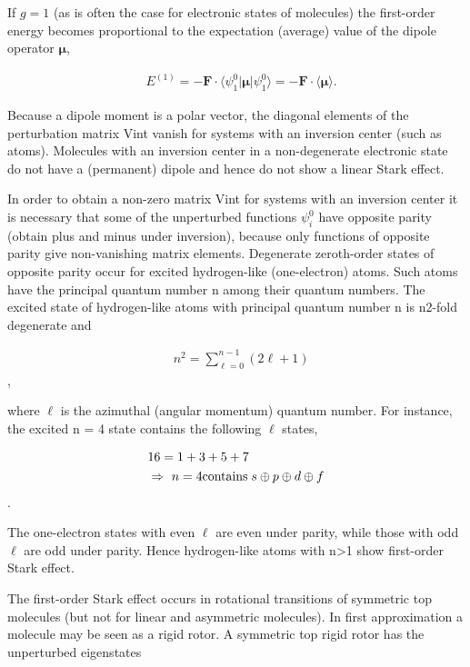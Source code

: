 If $g = 1$ (as is often the case for electronic states of molecules) the first-order energy becomes proportional to the expectation (average) value of the dipole operator $\boldsymbol{\mu}$,

\begin{align*}
&E^{(1)} = -\mathbf{F}\cdot \langle \psi^0_1 | \boldsymbol{\mu} | \psi^0_1 \rangle = -\mathbf{F}\cdot \langle \boldsymbol{\mu} \rangle.
\end{align*}

Because a dipole moment is a polar vector, the diagonal elements of the perturbation matrix Vint vanish for systems with an inversion center (such as atoms). Molecules with an inversion center in a non-degenerate electronic state do not have a (permanent) dipole and hence do not show a linear Stark effect.

In order to obtain a non-zero matrix Vint for systems with an inversion center it is necessary that some of the unperturbed functions $\psi^0_i$ have opposite parity (obtain plus and minus under inversion), because only functions of opposite parity give non-vanishing matrix elements. Degenerate zeroth-order states of opposite parity occur for excited hydrogen-like (one-electron) atoms. Such atoms have the principal quantum number n among their quantum numbers. The excited state of hydrogen-like atoms with principal quantum number n is n2-fold degenerate and

\begin{align*}
&n^2 = \sum_{\ell=0}^{n-1} (2 \ell + 1)
\end{align*}, 

where $\ell$ is the azimuthal (angular momentum) quantum number. For instance, the excited n = 4 state contains the following $\ell$ states,

\begin{align*}
&16 = 1 + 3 + 5 +7\ \\
&\Rightarrow\  n=4\hbox{contains}\; s\oplus p\oplus d\oplus f
\end{align*}. 

The one-electron states with even $\ell$ are even under parity, while those with odd $\ell$ are odd under parity. Hence hydrogen-like atoms with n>1 show first-order Stark effect.

The first-order Stark effect occurs in rotational transitions of symmetric top molecules (but not for linear and asymmetric molecules). In first approximation a molecule may be seen as a rigid rotor. A symmetric top rigid rotor has the unperturbed eigenstates

